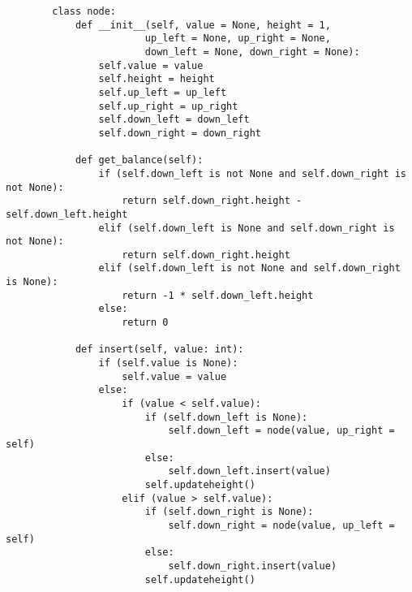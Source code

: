     \begin{lstlisting}
        class node:
            def __init__(self, value = None, height = 1,
                        up_left = None, up_right = None,
                        down_left = None, down_right = None):
                self.value = value
                self.height = height
                self.up_left = up_left
                self.up_right = up_right
                self.down_left = down_left
                self.down_right = down_right
                
            def get_balance(self):
                if (self.down_left is not None and self.down_right is not None):
                    return self.down_right.height - self.down_left.height
                elif (self.down_left is None and self.down_right is not None):
                    return self.down_right.height
                elif (self.down_left is not None and self.down_right is None):
                    return -1 * self.down_left.height
                else:
                    return 0
                
            def insert(self, value: int):
                if (self.value is None):
                    self.value = value
                else:
                    if (value < self.value):
                        if (self.down_left is None):
                            self.down_left = node(value, up_right = self)
                        else:
                            self.down_left.insert(value)
                        self.updateheight()
                    elif (value > self.value):
                        if (self.down_right is None):
                            self.down_right = node(value, up_left = self)
                        else:
                            self.down_right.insert(value)
                        self.updateheight()
                        

\end{lstlisting}
